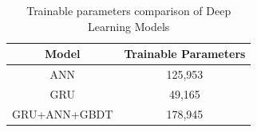 \documentclass[twoside,11pt,a4paper]{article}
\begin{document}
\begin{table}[h]
	\begin{center}
		\begin{tabular}{|| c | c ||} 
			\hline
			Model & Trainable Parameters \\ [0.5ex] 
			\hline\hline
			ANN	& 125,953 \\
			\hline
			GRU	& 49,165 \\
			\hline
			GRU+ANN+GBDT	& 178,945 \\
			\hline
		\end{tabular}
		\caption{Trainable parameters comparison of Deep Learning Models}
		\label{table:trainable_params}
	\end{center}
\end{table}
\begin{figure}[h!]
	

\end{figure}
\end{document}
